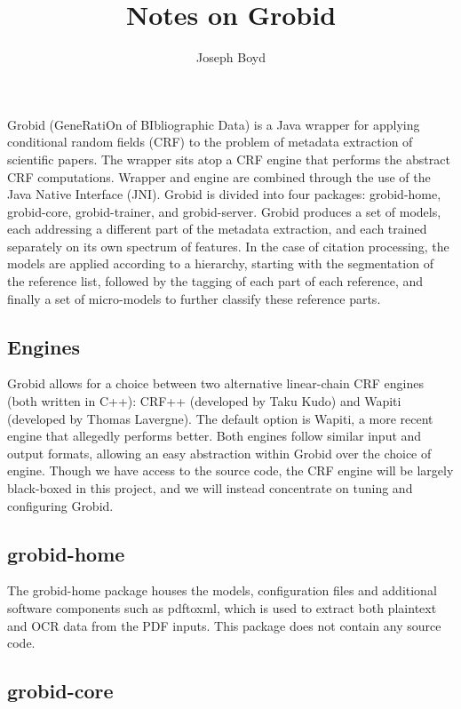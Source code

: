 \documentclass[11pt, oneside]{scrartcl}   	%
\title{Notes on Grobid}
\author{Joseph Boyd}
\date{}							%
\begin{document}
\maketitle

Grobid (GeneRatiOn of BIbliographic Data) is a Java wrapper for applying conditional random fields (CRF) to the problem of metadata extraction of scientific papers. The wrapper sits atop a CRF engine that performs the abstract CRF computations. Wrapper and engine are combined through the use of the Java Native Interface (JNI). Grobid is divided into four packages: grobid-home, grobid-core, grobid-trainer, and grobid-server. Grobid produces a set of models, each addressing a different part of the metadata extraction, and each trained separately on its own spectrum of features. In the case of citation processing, the models are applied according to a hierarchy, starting with the segmentation of the reference list, followed by the tagging of each part of each reference, and finally a set of micro-models to further classify these reference parts.

\subsection{Engines}

Grobid allows for a choice between two alternative linear-chain CRF engines (both written in C++): CRF++ (developed by Taku Kudo) and Wapiti (developed by Thomas Lavergne). The default option is Wapiti, a more recent engine that allegedly performs better. Both engines follow similar input and output formats, allowing an easy abstraction within Grobid over the choice of engine. Though we have access to the source code, the CRF engine will be largely black-boxed in this project, and we will instead concentrate on tuning and configuring Grobid.

\subsection{grobid-home}

The grobid-home package houses the models, configuration files and additional software components such as pdftoxml, which is used to extract both plaintext and OCR data from the PDF inputs. This package does not contain any source code.

\subsection{grobid-core}
\end{document}
